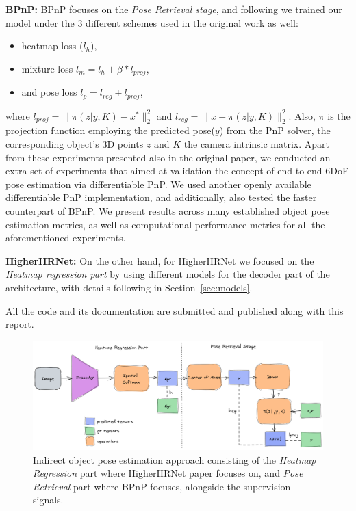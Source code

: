 \textbf{BPnP:} BPnP focuses on the \textit{Pose Retrieval stage}, and following \cite{chen2020end} we trained our model under the 3 different schemes used in the original work as well:
\begin{itemize}
    \item heatmap loss ($l_h$),
    \item mixture loss $l_m = l_h + \beta*l_{proj}$,
    \item and pose loss $l_{p} = l_{reg} + l_{proj}$,
\end{itemize}   
where $l_{proj} =\|\pi(z | y, K) - x^* \|^2_2$ and $l_{reg} =\| x - \pi(z | y, K) \|^2_2$.
Also, $\pi$ is the projection function employing the predicted pose($y$) from the PnP solver, the corresponding object's 3D points $z$ and $K$ the camera intrinsic matrix. 
Apart from these experiments presented also in the original paper, we conducted an extra set of experiments that aimed at validation the concept of end-to-end 6DoF pose estimation via differentiable PnP.
We used another openly available differentiable PnP implementation, and additionally, also tested the faster counterpart of BPnP. 
We present results across many established object pose estimation metrics, as well as computational performance metrics for all the aforementioned experiments.

\textbf{HigherHRNet:} On the other hand, for HigherHRNet we focused on the \textit{Heatmap regression part} by using different models for the decoder part of the architecture, with details following in Section~\ref{sec:models}.

All the code and its documentation are submitted and published along with this report.

\begin{figure}[hbt!]
  \includegraphics[scale=0.25]{../openreview/figures/method_5.png}
  \caption{Indirect object pose estimation approach consisting of the \textit{Heatmap Regression} part where HigherHRNet paper focuses on, and \textit{Pose Retrieval} part where BPnP focuses, alongside the supervision signals.}
\label{fig:methodology}
\end{figure}


